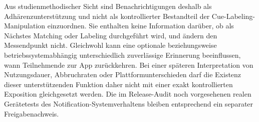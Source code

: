 \begin{neu}
Aus studienmethodischer Sicht sind Benachrichtigungen deshalb als Adhärenzunterstützung und nicht als kontrollierter Bestandteil der Cue-Labeling-Manipulation einzuordnen. Sie enthalten keine Information darüber, ob als Nächstes Matching oder Labeling durchgeführt wird, und ändern den Messendpunkt nicht. Gleichwohl kann eine optionale beziehungsweise betriebssystemabhängig unterschiedlich zuverlässige Erinnerung beeinflussen, wann Teilnehmende zur App zurückkehren. Bei einer späteren Interpretation von Nutzungsdauer, Abbruchraten oder Plattformunterschieden darf die Existenz dieser unterstützenden Funktion daher nicht mit einer exakt kontrollierten Exposition gleichgesetzt werden. Die im Release-Audit noch vorgesehenen realen Gerätetests des Notification-Systemverhaltens bleiben entsprechend ein separater Freigabenachweis.
\end{neu}
